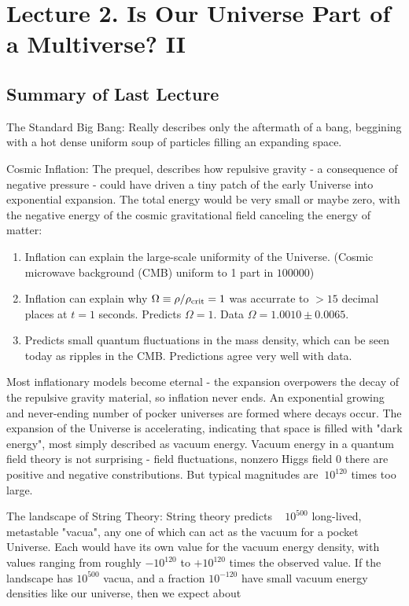 \section{Lecture 2. Is Our Universe Part of a Multiverse? II}

\subsection*{Summary of Last Lecture}

The Standard Big Bang: Really describes only the aftermath of a bang, beggining with a hot dense uniform soup of particles filling an expanding space.

Cosmic Inflation: The prequel, describes how repulsive gravity - a consequence of negative pressure - could have driven a tiny patch of the early Universe into exponential expansion. The total energy would be very small or maybe zero, with the negative energy of the cosmic gravitational field canceling the energy of matter:
\begin{enumerate}
    \item Inflation can explain the large-scale uniformity of the Universe. (Cosmic microwave background (CMB) uniform to 1 part in $100 000$)
    \item Inflation can explain why $\Omega \equiv \rho/\rho_{\rm crit}=1$ was accurrate to $>15$ decimal places at $t=1$ seconds. Predicts $\Omega = 1$. Data $\Omega = 1.0010 \pm 0.0065$.
    \item Predicts small quantum fluctuations in the mass density, which can be seen today as ripples in the CMB. Predictions agree very well with data.
\end{enumerate}

Most inflationary models become eternal - the expansion overpowers the decay of the repulsive gravity material, so inflation never ends. An exponential growing and never-ending number of pocker universes are formed where decays occur. The expansion of the Universe is accelerating, indicating that space is filled with "dark energy", most simply described as vacuum energy. Vacuum energy in a quantum field theory is not surprising - field fluctuations, nonzero Higgs field 0 there are positive and negative constributions. But typical magnitudes are $~ 10^{120}$ times too large.

The landscape of String Theory: String theory predicts ~ $10^{500}$ long-lived, metastable "vacua", any one of which can act as the vacuum for a pocket Universe. Each would have its own value for the vacuum energy density, with values ranging from roughly $-10^{120}$ to $+10^{120}$ times the observed value. If the landscape has $10^{500}$ vacua, and a fraction $10^{-120}$ have small vacuum energy densities like our universe, then we expect about

